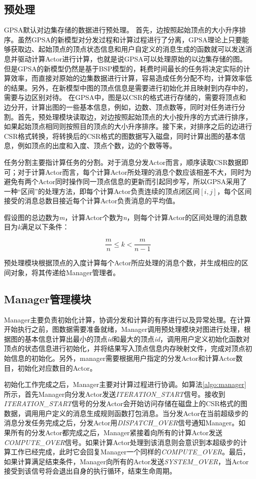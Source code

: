 \subsection{预处理}
GPSA默认对边集存储的数据进行预处理。
首先，边按照起始顶点的大小升序排序。虽然GPSA的新模型对分发过程和计算过程进行了分离，GPSA理论上只要能够获取边、起始顶点的顶点状态信息和用户自定义的消息生成的函数就可以发送消息并驱动计算Actor进行计算，也就是说GPSA可以处理原始的以边集存储的图。但是GPSA的新模型仍然是基于BSP模型的，耗费时间最长的任务将决定实际的计算效率，而直接对原始的边集数据进行计算，容易造成任务分配不均，计算效率低的结果。另外，在新模型中图的顶点信息是需要进行初始化并且映射到内存中的，需要与边区别对待。
在GPSA中，图是以CSR的格式进行存储的，需要将顶点和边分开，计算出图的一些基本信息，例如，边数、顶点数等，同时对任务进行分割。首先，预处理模块读取边，对边按照起始顶点的大小按升序的方式进行排序，如果起始顶点相同则按照目的顶点的大小升序排序。接下来，对排序之后的边进行CSR格式转换，将转换后的CSR格式的图数据写入磁盘，同时计算出图的基本信息，例如顶点的出度和入度、顶点个数，边的个数等等。

任务分割主要指计算任务的分割。对于消息分发Actor而言，顺序读取CSR数据即可；对于计算Actor而言，每个计算Actor所处理的消息个数应该相差不大，同时为避免有两个Actor同时操作同一顶点信息的更新而引起同步写，所以GPSA采用了一种“区间”的处理方法，即每个计算Actor负责连续的顶点闭区间$[i,j]$，每个区间接受的消息总数目接近每个计算Actor负责消息的平均值。

假设图的总边数为\textit{m}，计算Actor个数为\textit{n}，则每个计算Actor的区间处理的消息数目为\textit{k}满足以下条件：

\[\frac{m}{n} \le k < \frac{m}{{n - 1}}\]

预处理模块根据顶点的入度计算每个Actor所应处理的消息个数，并生成相应的区间对象，将其传递给Manager管理者。
\subsection{Manager管理模块}
Manager主要负责初始化计算，协调分发和计算的有序进行以及异常处理。在计算开始执行之前，图数据需要准备就绪，Manager调用预处理模块对图进行处理，根据图的基本信息计算出最小的顶点\textit{id}和最大的顶点\textit{id}，调用用户定义初始化函数对顶点的状态信息进行初始化，并将结果写入顶点信息内存映射文件，完成对顶点初始信息的初始化。另外，manager需要根据用户指定的分发Actor和计算Actor数目，初始化对应数目的Actor。

初始化工作完成之后，Manager主要对计算过程进行协调。如算法\ref{algo:manager}所示，首先Manager向分发Actor发送\textit{ITERATION\_START}信号。接收到\textit{ITERATION\_START}信号的分发Actor会开始访问存储在磁盘上的CSR格式的图数据，调用用户定义的消息生成规则函数打包消息。当分发Actor在当前超级步的消息分发任务完成之后，分发Actor用\textit{DISPATCH\_OVER}信号通知Manager。如果所有的分发Actor都完成之后，Manager紧接着向所有的计算Actor发送\textit{COMPUTE\_OVER}信号。如果计算Actor处理到该消息则会意识到本超级步的计算工作已经完成，此时它会回复Manager一个同样的\textit{COMPUTE\_OVER}。最后，如果计算满足结束条件，Manager向所有的Actor发送\textit{SYSTEM\_OVER}，当Actor接受到该信号将会退出自身的执行循环，结束生命周期。


